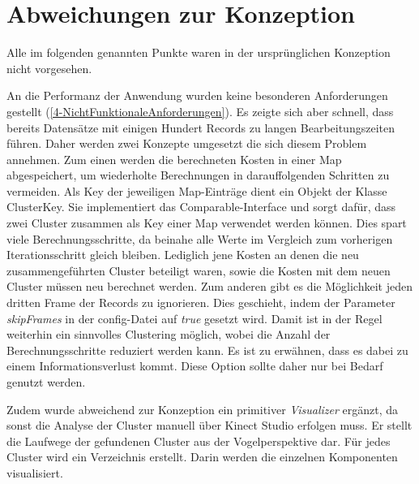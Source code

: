 \clearpage
\section{Abweichungen zur Konzeption}
\label{5-AbweichungenKonzeption}
Alle im folgenden genannten Punkte waren in der ursprünglichen Konzeption nicht vorgesehen.

An die Performanz der Anwendung wurden keine besonderen Anforderungen gestellt
(\autoref{4-NichtFunktionaleAnforderungen}).
Es zeigte sich aber schnell, dass bereits Datensätze mit einigen Hundert Records zu langen Bearbeitungszeiten führen.
Daher werden zwei Konzepte umgesetzt die sich diesem Problem annehmen.
Zum einen werden die berechneten Kosten in einer Map abgespeichert,
um wiederholte Berechnungen in darauffolgenden Schritten zu vermeiden.
Als Key der jeweiligen Map-Einträge dient ein Objekt der Klasse ClusterKey.
Sie implementiert das Comparable-Interface und sorgt dafür,
dass zwei Cluster zusammen als Key einer Map verwendet werden können.
Dies spart viele Berechnungsschritte,
da beinahe alle Werte im Vergleich zum vorherigen Iterationsschritt gleich bleiben.
Lediglich jene Kosten an denen die neu zusammengeführten Cluster beteiligt waren,
sowie die Kosten mit dem neuen Cluster müssen neu berechnet werden.
Zum anderen gibt es die Möglichkeit jeden dritten Frame der Records zu ignorieren.
Dies geschieht, indem der Parameter \emph{skipFrames} in der config-Datei auf \emph{true} gesetzt wird.
Damit ist in der Regel weiterhin ein sinnvolles Clustering möglich,
wobei die Anzahl der Berechnungsschritte reduziert werden kann.
Es ist zu erwähnen, dass es dabei zu einem Informationsverlust kommt.
Diese Option sollte daher nur bei Bedarf genutzt werden.

Zudem wurde abweichend zur Konzeption ein primitiver \emph{Visualizer} ergänzt,
da sonst die Analyse der Cluster manuell über Kinect Studio erfolgen muss.
Er stellt die Laufwege der gefundenen Cluster aus der Vogelperspektive dar.
Für jedes Cluster wird ein Verzeichnis erstellt.
Darin werden die einzelnen Komponenten visualisiert.